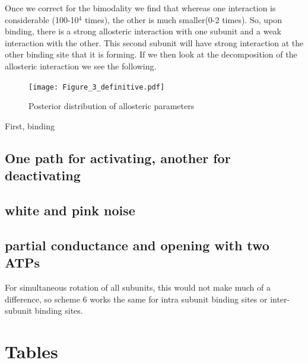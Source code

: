 \documentclass[pdflatex,sn-mathphys-num]{sn-jnl}%
\theoremstyle{thmstyleone}%
\theoremstyle{thmstyletwo}%
\theoremstyle{thmstylethree}%
\begin{document}
Once we correct for the bimodality we find that whereas one interaction is considerable (100-10$^4$ times), the other is much smaller(0-2 times). So, upon binding, there is a strong allosteric interaction with one subunit and a weak interaction with the other. This second subunit will have strong interaction at the other binding site that it is forming. 
If we then look at the decomposition of the allosteric interaction we see the following.


\begin{figure}[h]
\centering
\texttt{[image: Figure\_3\_definitive.pdf]}
\caption{Posterior distribution of allosteric parameters}
\label{fig_bimodal}
\end{figure}


First, binding 




\subsection{One path for activating, another for deactivating}

\subsection{white and pink noise}

\subsection{partial conductance and opening with two ATPs}


For simultaneous rotation of all subunits, this would not make much of a difference, so scheme 6 works the same for intra subunit binding sites or inter-subunit binding sites. 









\section{Tables}\label{sec5}
\end{document}
